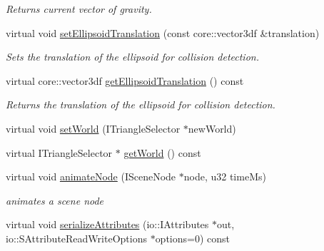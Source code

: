 \begin{DoxyCompactItemize}
\begin{DoxyCompactList}\small\item\em Returns current vector of gravity. \end{DoxyCompactList}\item 
\hypertarget{classirr_1_1scene_1_1_c_scene_node_animator_collision_response_a71f856dea3f35390381482346783d1e8}{virtual void \hyperlink{classirr_1_1scene_1_1_c_scene_node_animator_collision_response_a71f856dea3f35390381482346783d1e8}{set\-Ellipsoid\-Translation} (const core\-::vector3df \&translation)}\label{classirr_1_1scene_1_1_c_scene_node_animator_collision_response_a71f856dea3f35390381482346783d1e8}

\begin{DoxyCompactList}\small\item\em Sets the translation of the ellipsoid for collision detection. \end{DoxyCompactList}\item 
\hypertarget{classirr_1_1scene_1_1_c_scene_node_animator_collision_response_aad33a31bbdd80cabe9239b8a7f857762}{virtual core\-::vector3df \hyperlink{classirr_1_1scene_1_1_c_scene_node_animator_collision_response_aad33a31bbdd80cabe9239b8a7f857762}{get\-Ellipsoid\-Translation} () const }\label{classirr_1_1scene_1_1_c_scene_node_animator_collision_response_aad33a31bbdd80cabe9239b8a7f857762}

\begin{DoxyCompactList}\small\item\em Returns the translation of the ellipsoid for collision detection. \end{DoxyCompactList}\item 
virtual void \hyperlink{classirr_1_1scene_1_1_c_scene_node_animator_collision_response_a8839553ce54c03941ba19dad2cd53a6d}{set\-World} (I\-Triangle\-Selector $\ast$new\-World)
\item 
virtual I\-Triangle\-Selector $\ast$ \hyperlink{classirr_1_1scene_1_1_c_scene_node_animator_collision_response_ad3ffe8337b182f43589c517020c4f188}{get\-World} () const 
\item 
\hypertarget{classirr_1_1scene_1_1_c_scene_node_animator_collision_response_a775ac33b665ef86b99fefad969e3e0e4}{virtual void \hyperlink{classirr_1_1scene_1_1_c_scene_node_animator_collision_response_a775ac33b665ef86b99fefad969e3e0e4}{animate\-Node} (I\-Scene\-Node $\ast$node, u32 time\-Ms)}\label{classirr_1_1scene_1_1_c_scene_node_animator_collision_response_a775ac33b665ef86b99fefad969e3e0e4}

\begin{DoxyCompactList}\small\item\em animates a scene node \end{DoxyCompactList}\item 
\hypertarget{classirr_1_1scene_1_1_c_scene_node_animator_collision_response_a53f2e2bcb261d8c35737f082c7f04d1d}{virtual void \hyperlink{classirr_1_1scene_1_1_c_scene_node_animator_collision_response_a53f2e2bcb261d8c35737f082c7f04d1d}{serialize\-Attributes} (io\-::\-I\-Attributes $\ast$out, io\-::\-S\-Attribute\-Read\-Write\-Options $\ast$options=0) const }\label{classirr_1_1scene_1_1_c_scene_node_animator_collision_response_a53f2e2bcb261d8c35737f082c7f04d1d}


\end{DoxyCompactItemize}
